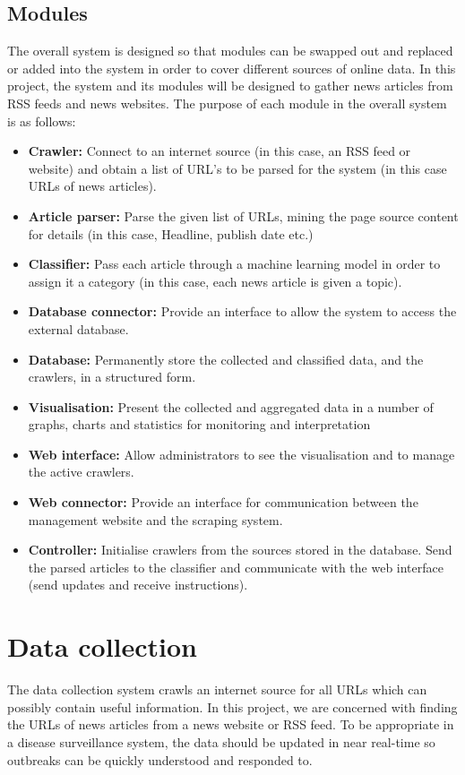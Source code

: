 \documentclass{l4proj}
\begin{document}
\subsection{Modules}
The overall system is designed so that modules can be swapped out and replaced or added into the system in order to cover different sources of online data. In this project, the system and its modules will be designed to gather news articles from RSS feeds and news websites. The purpose of each module in the overall system is as follows:
\begin{itemize}
    \item \textbf{Crawler: } Connect to an internet source (in this case, an RSS feed or website) and obtain a list of URL's to be parsed for the system (in this case URLs of news articles).
    \item \textbf{Article parser: } Parse the given list of URLs, mining the page source content for details (in this case, Headline, publish date etc.)
    \item \textbf{Classifier: } Pass each article through a machine learning model in order to assign it a category (in this case, each news article is given a topic).
    \item \textbf{Database connector: } Provide an interface to allow the system to access the external database.
    \item \textbf{Database: } Permanently store the collected and classified data, and the crawlers, in a structured form.
    \item \textbf{Visualisation: } Present the collected and aggregated data in a number of graphs, charts and statistics for monitoring and interpretation
    \item \textbf{Web interface: } Allow administrators to see the visualisation and to manage the active crawlers.
    \item \textbf{Web connector: } Provide an interface for communication between the management website and the scraping system.
    \item \textbf{Controller: } Initialise crawlers from the sources stored in the database. Send the parsed articles to the classifier and communicate with the web interface (send updates and receive instructions).
\end{itemize}


\section{Data collection}
The data collection system crawls an internet source for all URLs which can possibly contain useful information. In this project, we are concerned with finding the URLs of news articles from a news website or RSS feed. To be appropriate in a disease surveillance system, the data should be updated in near real-time so outbreaks can be quickly understood and responded to.
\end{document}
